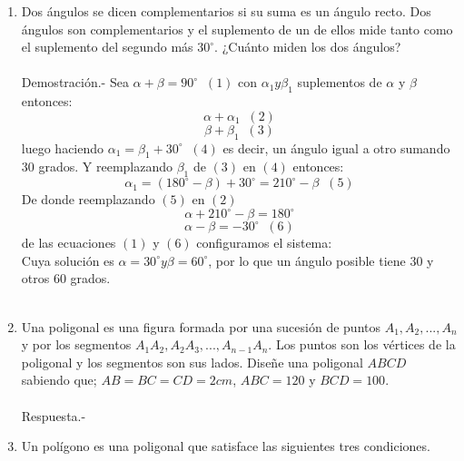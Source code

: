 \begin{enumerate}
	\item Dos ángulos se dicen complementarios si su suma es un ángulo recto. Dos ángulos son complementarios y el suplemento de un de ellos mide tanto como el suplemento del segundo más $30^{\circ}$. ¿Cuánto miden los dos ángulos?\\\\
	    Demostración.-\; Sea $\alpha + \beta = 90^{\circ}\;\; (1)$ con $\alpha_1 y \beta_1$ suplementos de $\alpha$ y $\beta$ entonces: $$\alpha + \alpha_1\;\; (2)$$ 
	    $$\beta + \beta_1\;\; (3)$$ luego haciendo $\alpha_1 = \beta_1 + 30^{\circ}\;\; (4)$ es decir, un ángulo igual a otro sumando $30$ grados. Y reemplazando $\beta_1$ de $(3)$ en $(4)$ entonces: 
	    $$\alpha_1 = (180^{\circ} - \beta) + 30^{\circ} = 210^{\circ} - \beta \;\; (5)$$ De donde reemplazando $(5)$ en $(2)$ 
	    $$\alpha + 210^{\circ} - \beta = 180^{\circ}$$ 
	    $$\alpha - \beta = -30^{\circ}\;\; (6)$$ de las ecuaciones $(1)$ y $(6)$ configuramos el sistema:\\
	    Cuya solución es $\alpha = 30^{\circ} y \beta = 60^{\circ}$, por lo que un ángulo posible tiene $30$ y otros $60$ grados.\\\\

	\item Una poligonal es una figura formada por una sucesión de puntos $A_1,A_2,...,A_n$ y por los segmentos $A_1A_2,A_2A_3,...,A_{n-1}A_n$. Los puntos son los vértices de la poligonal y los segmentos son sus lados. Diseñe una poligonal $ABCD$ sabiendo que; $AB=BC=CD=2cm$, $ABC=120$ y $BCD=100$.\\\\
	Respuesta.-\; 

	    \begin{center}
	    \end{center}

	\item Un polígono es una poligonal que satisface las siguientes tres condiciones.
	    \begin{enumerate}[\bfseries a)]


\end{enumerate}
\end{enumerate}
